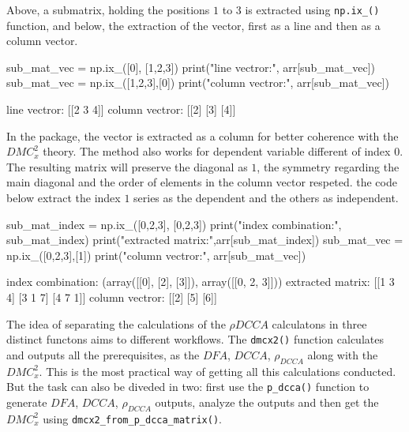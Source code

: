 \documentclass[article]{jss}
\begin{document}
Above, a submatrix, holding the positions $1$ to $3$ is extracted using \verb"np.ix_()" function, and below, the extraction of the vector, first as a line and then as a column vector.
\begin{CodeChunk}

\begin{CodeInput}
sub_mat_vec = np.ix_([0], [1,2,3])
print("line vectror:\n", arr[sub_mat_vec])
sub_mat_vec = np.ix_([1,2,3],[0])
print("column vectror:\n", arr[sub_mat_vec])
\end{CodeInput}

\begin{CodeOutput}
line vectror:
[[2 3 4]]
column vectror:
[[2]
[3]
[4]]
\end{CodeOutput}
\end{CodeChunk}

In the  package, the vector is extracted as a column for better coherence with the $DMC_{x}^{2}$ theory. The method also works for dependent variable different of index $0$. The resulting matrix will preserve the diagonal as $1$, the symmetry regarding the main diagonal and the order of elements in the column vector respeted. the code below extract the index $1$ series as the dependent and the others as independent.
\begin{CodeChunk}
\begin{CodeInput}
sub_mat_index = np.ix_([0,2,3], [0,2,3])
print("index combination:\n", sub_mat_index)
print("extracted matrix:\n",arr[sub_mat_index])
sub_mat_vec = np.ix_([0,2,3],[1])
print("column vectror:\n", arr[sub_mat_vec])
\end{CodeInput}

\begin{CodeOutput}
index combination:
(array([[0],
      [2],
      [3]]), array([[0, 2, 3]]))
extracted matrix:
[[1 3 4]
[3 1 7]
[4 7 1]]
column vectror:
[[2]
[5]
[6]]
\end{CodeOutput}
\end{CodeChunk}

The idea of separating the calculations of the $\rho{DCCA}$ calculatons in three distinct functons aims to different workflows. The \verb"dmcx2()" function calculates and outputs all the prerequisites, as the $DFA$, $DCCA$, $\rho_{DCCA}$ along with the $DMC_{x}^{2}$. This is the most practical way of getting all this calculations conducted. But the task can also be diveded in two: first use the \verb"p_dcca()" function to generate $DFA$, $DCCA$, $\rho_{DCCA}$ outputs, analyze the outputs and then get the $DMC_{x}^{2}$ using \verb"dmcx2_from_p_dcca_matrix()".
\end{document}
